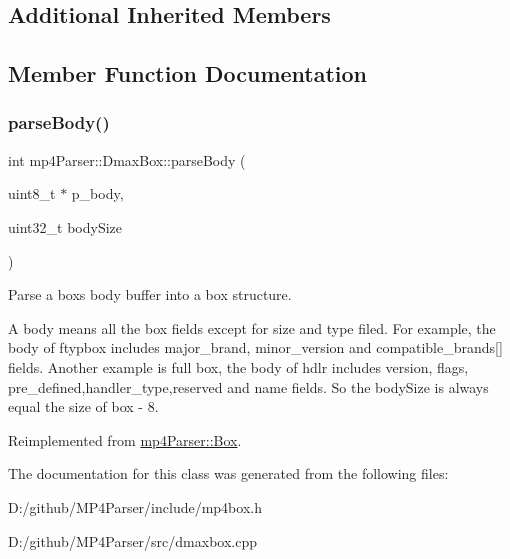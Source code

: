 \subsection*{Additional Inherited Members}


\subsection{Member Function Documentation}
\mbox{\label{classmp4_parser_1_1_dmax_box_ab786df72363e5b819e553168e3922ab1}} 
\subsubsection{\texorpdfstring{parseBody()}{parseBody()}}
{\footnotesize\ttfamily int mp4\+Parser\+::\+Dmax\+Box\+::parse\+Body (\begin{DoxyParamCaption}\item[{uint8\+\_\+t $\ast$}]{p\+\_\+body,  }\item[{uint32\+\_\+t}]{body\+Size }\end{DoxyParamCaption})\hspace{0.3cm}{\ttfamily [virtual]}}



Parse a box\textquotesingle{}s body buffer into a box structure. 

A body means all the box fields except for size and type filed. For example, the body of ftypbox includes major\+\_\+brand, minor\+\_\+version and compatible\+\_\+brands\mbox{[}\mbox{]} fields. Another example is full box, the body of hdlr includes version, flags, pre\+\_\+defined,handler\+\_\+type,reserved and name fields. So the body\+Size is always equal the size of box -\/ 8. 

Reimplemented from \mbox{\hyperlink{classmp4_parser_1_1_box_a3dd0c084ac65bc77b69ac5ecaf796cb2}{mp4\+Parser\+::\+Box}}.



The documentation for this class was generated from the following files\+:\begin{DoxyCompactItemize}
\item 
D\+:/github/\+M\+P4\+Parser/include/mp4box.\+h\item 
D\+:/github/\+M\+P4\+Parser/src/dmaxbox.\+cpp\end{DoxyCompactItemize}
